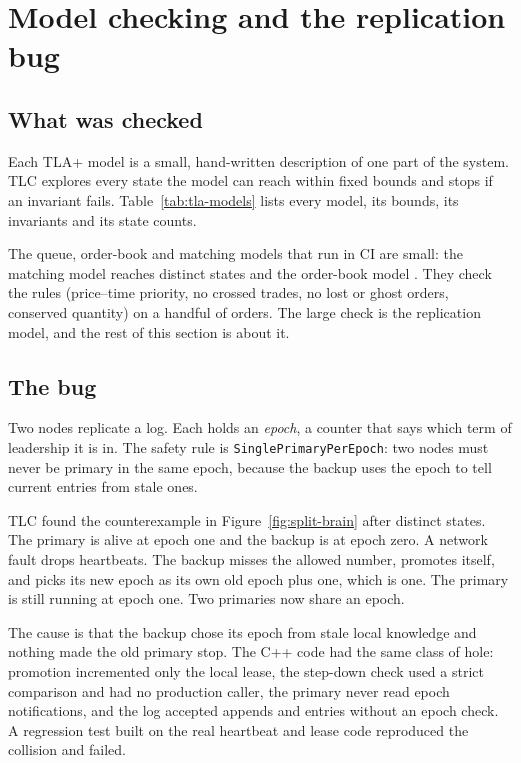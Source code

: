 \section{Model checking and the replication bug}\label{sec:model-checking}

\subsection{What was checked}
Each TLA+ model is a small, hand-written description of one part of the system. TLC explores every state the model can reach within fixed bounds and stops if an invariant fails. Table~\ref{tab:tla-models} lists every model, its bounds, its invariants and its state counts.

The queue, order-book and matching models that run in CI are small: the matching model reaches \TlaEngineMatchingEngineDistinct{} distinct states and the order-book model \TlaEngineOrderBookDistinct{}. They check the rules (price--time priority, no crossed trades, no lost or ghost orders, conserved quantity) on a handful of orders. The large check is the replication model, and the rest of this section is about it.



\subsection{The bug}
Two nodes replicate a log. Each holds an \emph{epoch}, a counter that says which term of leadership it is in. The safety rule is \texttt{SinglePrimaryPerEpoch}: two nodes must never be primary in the same epoch, because the backup uses the epoch to tell current entries from stale ones.

TLC found the counterexample in Figure~\ref{fig:split-brain} after \TlaUnfencedDistinct{} distinct states. The primary is alive at epoch one and the backup is at epoch zero. A network fault drops heartbeats. The backup misses the allowed number, promotes itself, and picks its new epoch as its own old epoch plus one, which is one. The primary is still running at epoch one. Two primaries now share an epoch.

The cause is that the backup chose its epoch from stale local knowledge and nothing made the old primary stop. The C++ code had the same class of hole: promotion incremented only the local lease, the step-down check used a strict comparison and had no production caller, the primary never read epoch notifications, and the log accepted appends and entries without an epoch check. A regression test built on the real heartbeat and lease code reproduced the collision and failed.

